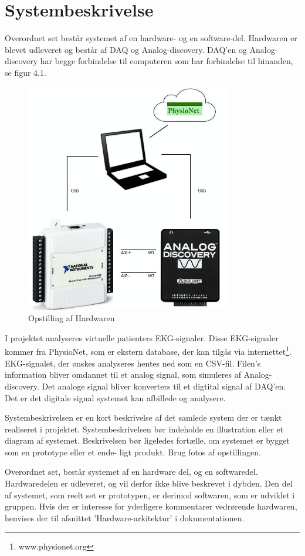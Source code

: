 \chapter{Systembeskrivelse}

Overordnet set består systemet af en hardware- og en software-del. Hardwaren er blevet udleveret og består af DAQ og Analog-discovery. DAQ'en og Analog-discovery har begge forbindelse til computeren som har forbindelse til hinanden, se figur 4.1.  

\begin{figure}[H]
	\centering
	\includegraphics[width=0.8\textwidth]{Figurer/Snip20150427_1}
	\caption{Opstilling af Hardwaren}
\end{figure}

I projektet analyseres virtuelle patienters EKG-signaler. Disse EKG-signaler kommer fra PhysioNet, som er ekstern database, der kan tilgås via internettet\footnote{www.physionet.org}. EKG-signalet, der ønskes analyseres hentes ned som en CSV-fil. Filen's information bliver omdannet til et analog signal, som simuleres af Analog-discovery. Det analoge signal bliver konverters til et digtital signal af DAQ'en. Det er det digitale signal systemet kan afbillede og analysere.   


Systembeskrivelsen er en kort beskrivelse af det samlede system der er tænkt realiseret i projektet. Systembeskrivelsen bør indeholde en illustration eller et diagram af systemet.
Beskrivelsen bør ligeledes fortælle, om systemet er bygget som en prototype eller et ende- ligt produkt. Brug fotos af opstillingen.



Overordnet set, består systemet af en hardware del, og en softwaredel. Hardwaredelen er udleveret, og vil derfor ikke blive beskrevet i dybden. Den del af systemet, som reelt set er prototypen, er derimod softwaren, som er udviklet i gruppen. Hvis der er interesse for yderligere kommentarer vedrørende hardwaren, henvises der til afsnittet ’Hardware-arkitektur’ i dokumentationen.
